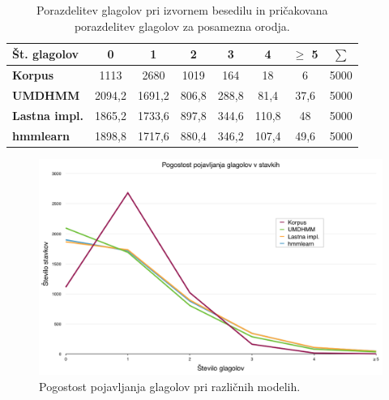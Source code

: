 \begin{table}
\centering
\begin{tabular}{|l|c|c|c|c|c|c|c|}
\hline
{\bf Št. glagolov} & {\bf 0} & {\bf 1} & {\bf 2} & {\bf 3} & {\bf 4} & {\bf $\geq$ 5} & {\bf $\sum$} \\
\hline
{\bf Korpus}        & 1113   & 2680   & 1019   & 164   & 18    & 6    & 5000 \\
{\bf UMDHMM}        & 2094,2 & 1691,2 & 806,8  & 288,8 & 81,4  & 37,6 & 5000 \\
{\bf Lastna impl.}  & 1865,2 & 1733,6 & 897,8  & 344,6 & 110,8 & 48   & 5000 \\
{\bf hmmlearn}      & 1898,8 & 1717,6 & 880,4  & 346,2 & 107,4 & 49,6 & 5000 \\
\hline
\end{tabular}
\caption{Porazdelitev glagolov pri izvornem besedilu in pričakovana
  porazdelitev glagolov za posamezna orodja.}
\label{tab:bench_model_table}
\end{table}

\begin{figure}
\begin{center}
\includegraphics[width=\textwidth]{images/bench_model_comparison.png}
\end{center}
\caption{Pogostost pojavljanja glagolov pri različnih modelih.}
\label{fig:bench_model_comparison}
\end{figure}
